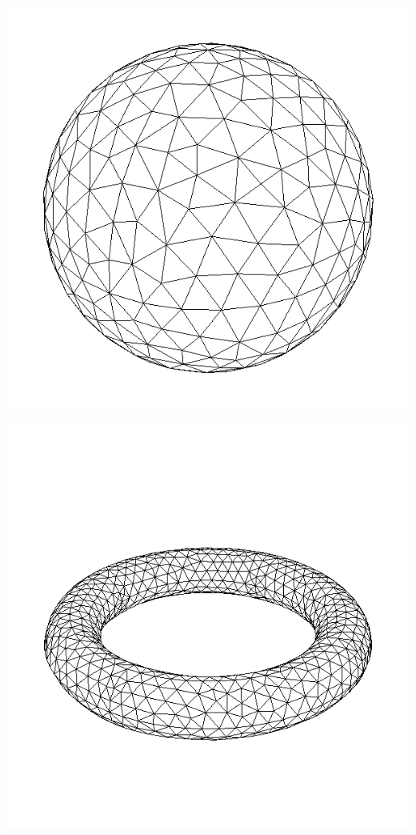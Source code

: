 \indent

\begingroup
	\begin{minipage}{.3\linewidth}
		\centering
		\includegraphics[scale=.2]{Bordeaux/figures/3D/sphereLS.png}
	\end{minipage}
	\hfill
	\begin{minipage}{.3\linewidth}
		\centering
		\includegraphics[scale=.2]{Bordeaux/figures/3D/torusLS.png}
	\end{minipage}
